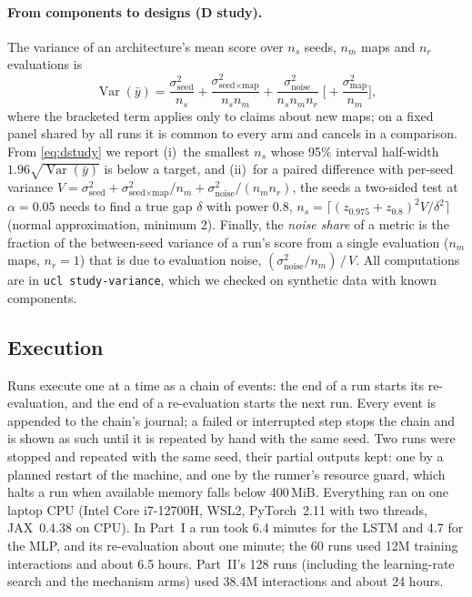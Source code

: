 \paragraph{From components to designs (D study).}
The variance of an architecture's mean score over $n_s$ seeds, $n_m$ maps and $n_r$ evaluations is
\begin{equation}
  \operatorname{Var}(\bar y) = \frac{\sigma^2_{\text{seed}}}{n_s}
    + \frac{\sigma^2_{\text{seed}\times\text{map}}}{n_s n_m}
    + \frac{\sigma^2_{\text{noise}}}{n_s n_m n_r}
    \;\Big[+\frac{\sigma^2_{\text{map}}}{n_m}\Big],
  \label{eq:dstudy}
\end{equation}
where the bracketed term applies only to claims about new maps; on a fixed panel shared by all
runs it is common to every arm and cancels in a comparison. From \cref{eq:dstudy} we report
(i)~the smallest $n_s$ whose 95\% interval half-width $1.96\sqrt{\operatorname{Var}(\bar y)}$ is
below a target, and (ii)~for a paired difference with per-seed variance
$V=\sigma^2_{\text{seed}}+\sigma^2_{\text{seed}\times\text{map}}/n_m+\sigma^2_{\text{noise}}/(n_m n_r)$,
the seeds a two-sided test at $\alpha=0.05$ needs to find a true gap $\delta$ with power 0.8,
$n_s=\lceil(z_{0.975}+z_{0.8})^2 V/\delta^2\rceil$ (normal approximation, minimum 2). Finally,
the \emph{noise share} of a metric is the fraction of the between-seed variance of a run's score
from a single evaluation ($n_m$ maps, $n_r=1$) that is due to evaluation noise,
$(\sigma^2_{\text{noise}}/n_m)\,/\,V$. All computations are in
\texttt{ucl study-variance}, which we checked on synthetic data with known components.

\subsection{Execution}
\label{sec:execution}

Runs execute one at a time as a chain of events: the end of a run starts its re-evaluation, and
the end of a re-evaluation starts the next run. Every event is appended to the chain's journal; a
failed or interrupted step stops the chain and is shown as such until it is repeated by hand with
the same seed. Two runs were stopped and repeated with the same seed, their partial outputs kept:
one by a planned restart of the machine, and one by the runner's resource guard, which halts a
run when available memory falls below 400\,MiB. Everything ran on
one laptop CPU (Intel Core i7-12700H, WSL2, PyTorch~2.11 with two threads, JAX~0.4.38 on CPU).
In Part~I a run took 6.4 minutes for the LSTM and 4.7 for the MLP, and its re-evaluation about
one minute; the 60 runs used 12M training interactions and about 6.5 hours. Part~II's 128 runs
(including the learning-rate search and the mechanism arms) used 38.4M interactions and about
24 hours.
